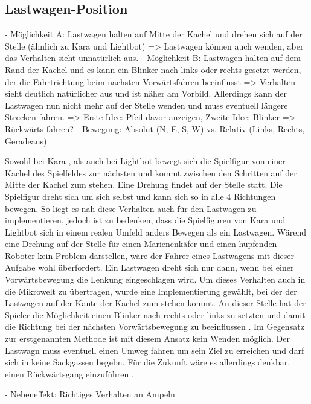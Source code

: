 \subsection{Lastwagen-Position}

- Möglichkeit A: Lastwagen halten auf Mitte der Kachel und drehen sich auf der Stelle (ähnlich zu Kara und Lightbot)
  => Lastwagen können auch wenden, aber das Verhalten sieht unnatürlich aus.
- Möglichkeit B: Lastwagen halten auf dem Rand der Kachel und es kann ein Blinker nach links oder rechts gesetzt werden, der die Fahrtrichtung beim nächsten Vorwärtsfahren beeinflusst
  => Verhalten sieht deutlich natürlicher aus und ist näher am Vorbild. Allerdings kann der Lastwagen nun nicht mehr auf der Stelle wenden und muss eventuell längere Strecken fahren.
  => Erste Idee: Pfeil davor anzeigen, Zweite Idee: Blinker
  => Rückwärts fahren?
- Bewegung: Absolut (N, E, S, W) vs. Relativ (Links, Rechts, Geradeaus)

Sowohl bei Kara , als auch bei Lightbot  bewegt sich die Spielfigur von einer Kachel des Spielfeldes zur nächsten und kommt zwischen den Schritten auf der Mitte der Kachel zum stehen. Eine Drehung findet auf der Stelle statt. Die Spielfigur dreht sich um sich selbst und kann sich so in alle 4 Richtungen bewegen. So liegt es nah diese Verhalten auch für den Lastwagen zu implementieren, jedoch ist zu bedenken, dass die Spielfiguren von Kara und Lightbot sich in einem realen Umfeld anders Bewegen als ein Lastwagen. Wärend eine Drehung auf der Stelle für einen Marienenkäfer und einen hüpfenden Roboter kein Problem darstellen, wäre der Fahrer eines Lastwagens mit dieser Aufgabe wohl überfordert. Ein Lastwagen dreht sich nur dann, wenn bei einer Vorwärtsbewegung die Lenkung eingeschlagen wird. Um dieses Verhalten auch in die Mikrowelt zu übertragen, wurde eine Implementierung gewählt, bei der der Lastwagen auf der Kante der Kachel zum stehen kommt. An dieser Stelle hat der Spieler die Möglichkeit einen Blinker nach rechts oder links zu setzten und damit die Richtung bei der nächsten Vorwärtsbewegung zu beeinflussen . Im Gegensatz zur erstgenannten Methode ist mit diesem Ansatz kein Wenden möglich. Der Lastwagn muss eventuell einen Umweg fahren um sein Ziel zu erreichen und darf sich in keine Sackgassen begebn. Für die Zukunft wäre es allerdings denkbar, einen Rückwärtsgang einzuführen .

- Nebeneffekt: Richtiges Verhalten an Ampeln

